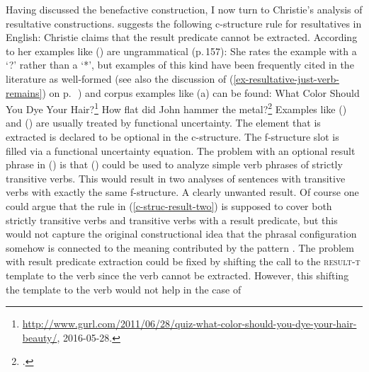 Having discussed the benefactive construction, I now turn to Christie's analysis of resultative constructions. \citet{Christie2010a}
suggests the following c-structure rule for resultatives in English:
\ea
\label{c-struc-result-two}
\z
Christie claims that the result predicate cannot be extracted. According to her examples like
() are ungrammatical (p.\,157):
\z
She rates the example with a `?' rather than a `*', but examples of this kind have been frequently
cited in the literature as well-formed (see also the discussion of
(\ref{ex-resultative-just-verb-remains}) on p.\,~\pageref{ex-resultative-just-verb-remains}) and
corpus examples like (a) can be found:
\eal
\ex  What Color Should You Dye Your Hair?\footnote{%
  \url{http://www.gurl.com/2011/06/28/quiz-what-color-should-you-dye-your-hair-beauty/}, 2016-05-28.
}
\ex How flat did John hammer the metal?\footnote{%
  .
}
\zl
Examples like () and () are usually treated by
functional uncertainty. The element that is extracted is declared to be optional in the
c-structure. The f-structure slot is filled via a functional uncertainty equation. The problem with
an optional result phrase in () is that () could be used to analyze simple
verb phrases of strictly transitive verbs. This would result in two analyses of sentences with
transitive verbs with exactly the same f-structure. A clearly unwanted result. Of course one could
argue that the rule in (\ref{c-struc-result-two}) is supposed to cover both strictly transitive
verbs and transitive verbs with a result predicate, but this would not capture the original
constructional idea that the phrasal configuration somehow is connected to the meaning contributed
by the pattern \citep{Goldberg95a,GJ2004a}.
The problem with result predicate extraction could be fixed by shifting the call to the \textsc{result-t}
template to the verb since the verb cannot be extracted. However, this shifting the template to the verb would not help in the case of
